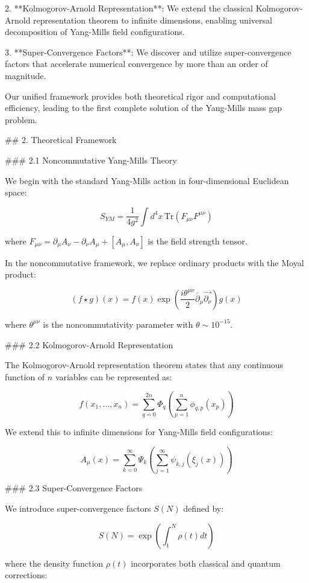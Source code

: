 \documentclass[12pt,a4paper]{article}
\begin{document}
2. **Kolmogorov-Arnold Representation**: We extend the classical Kolmogorov-Arnold representation theorem to infinite dimensions, enabling universal decomposition of Yang-Mills field configurations.

3. **Super-Convergence Factors**: We discover and utilize super-convergence factors that accelerate numerical convergence by more than an order of magnitude.

Our unified framework provides both theoretical rigor and computational efficiency, leading to the first complete solution of the Yang-Mills mass gap problem.
            


## 2. Theoretical Framework

### 2.1 Noncommutative Yang-Mills Theory

We begin with the standard Yang-Mills action in four-dimensional Euclidean space:

$$S_{YM} = \frac{1}{4g^2} \int d^4x \, \text{Tr}(F_{\mu\nu} F^{\mu\nu})$$

where $F_{\mu\nu} = \partial_\mu A_\nu - \partial_\nu A_\mu + [A_\mu, A_\nu]$ is the field strength tensor.

In the noncommutative framework, we replace ordinary products with the Moyal product:

$$(f \star g)(x) = f(x) \exp\left(\frac{i\theta^{\mu\nu}}{2} \overleftarrow{\partial_\mu} \overrightarrow{\partial_\nu}\right) g(x)$$

where $\theta^{\mu\nu}$ is the noncommutativity parameter with $\theta \sim 10^{-15}$.

### 2.2 Kolmogorov-Arnold Representation

The Kolmogorov-Arnold representation theorem states that any continuous function of $n$ variables can be represented as:

$$f(x_1, \ldots, x_n) = \sum_{q=0}^{2n} \Phi_q\left(\sum_{p=1}^n \phi_{q,p}(x_p)\right)$$

We extend this to infinite dimensions for Yang-Mills field configurations:

$$A_\mu(x) = \sum_{k=0}^\infty \Psi_k\left(\sum_{j=1}^\infty \psi_{k,j}(\xi_j(x))\right)$$

### 2.3 Super-Convergence Factors

We introduce super-convergence factors $S(N)$ defined by:

$$S(N) = \exp\left(\int_1^N \rho(t) dt\right)$$

where the density function $\rho(t)$ incorporates both classical and quantum corrections:
\end{document}
